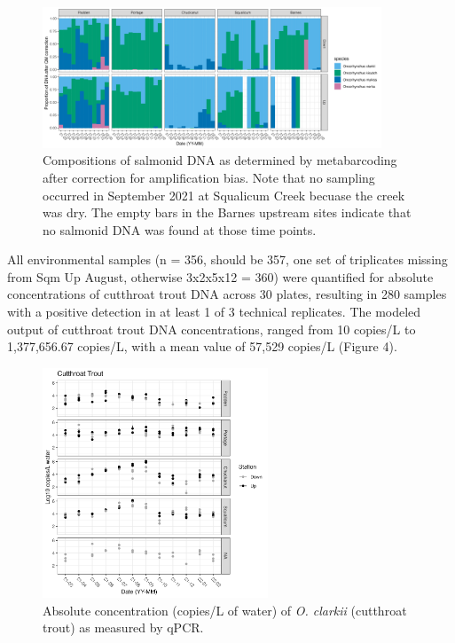 \documentclass[
]{article}
\begin{document}
\begin{figure}
\centering
\includegraphics[width=0.9\textwidth,height=\textheight]{../Output/Figures/20221123_proportions_after_qm.png}
\caption{Compositions of salmonid DNA as determined by metabarcoding
after correction for amplification bias. Note that no sampling occurred
in September 2021 at Squalicum Creek becuase the creek was dry. The
empty bars in the Barnes upstream sites indicate that no salmonid DNA
was found at those time points.}
\end{figure}

All environmental samples (n = 356, should be 357, one set of
triplicates missing from Sqm Up August, otherwise 3x2x5x12 = 360) were
quantified for absolute concentrations of cutthroat trout DNA across 30
plates, resulting in 280 samples with a positive detection in at least 1
of 3 technical replicates. The modeled output of cutthroat trout DNA
concentrations, ranged from 10 copies/L to 1,377,656.67 copies/L, with a
mean value of 57,529 copies/L (Figure 4).

\begin{figure}
\centering
\includegraphics[width=0.6\textwidth,height=\textheight]{../Output/Figures/20221123_modeled_cut_qpcr_updown.png}
\caption{Absolute concentration (copies/L of water) of \emph{O. clarkii}
(cutthroat trout) as measured by qPCR.}
\end{figure}
\end{document}
